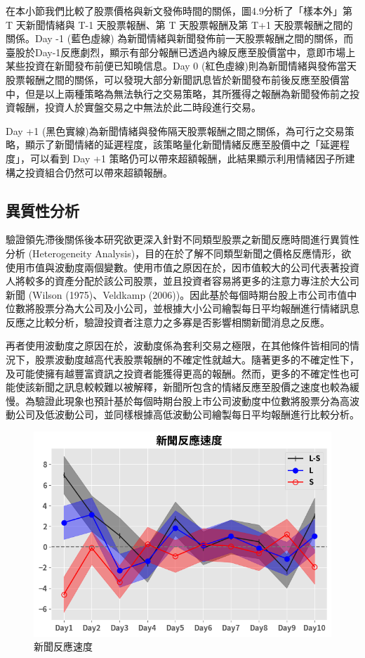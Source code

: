 \newpage

在本小節我們比較了股票價格與新文發佈時間的關係，圖4.9分析了「樣本外」第 T 天新聞情緒與 T-1 天股票報酬、第 T 天股票報酬及第 T+1 天股票報酬之間的關係。Day -1 (藍色虛線) 為新聞情緒與新聞發佈前一天股票報酬之間的關係，而臺股於Day-1反應劇烈，顯示有部分報酬已透過內線反應至股價當中，意即市場上某些投資在新聞發布前便已知曉信息。Day 0 (紅色虛線)則為新聞情緒與發佈當天股票報酬之間的關係，可以發現大部分新聞訊息皆於新聞發布前後反應至股價當中，但是以上兩種策略為無法執行之交易策略，其所獲得之報酬為新聞發佈前之投資報酬，投資人於實盤交易之中無法於此二時段進行交易。

Day +1 (黑色實線)為新聞情緒與發佈隔天股票報酬之間之關係，為可行之交易策略，顯示了新聞情緒的延遲程度，該策略量化新聞情緒反應至股價中之「延遲程度」，可以看到 Day +1 策略仍可以帶來超額報酬，此結果顯示利用情緒因子所建構之投資組合仍然可以帶來超額報酬。


\subsection{異質性分析}
驗證領先滯後關係後本研究欲更深入針對不同類型股票之新聞反應時間進行異質性分析 (Heterogeneity Analysis)，目的在於了解不同類型新聞之價格反應情形，欲使用市值與波動度兩個變數。使用市值之原因在於，因市值較大的公司代表著投資人將較多的資產分配於該公司股票，並且投資者容易將更多的注意力專注於大公司新聞 (Wilson (1975)、Veldkamp (2006))。因此基於每個時期台股上市公司市值中位數將股票分為大公司及小公司，並根據大小公司繪製每日平均報酬進行情緒訊息反應之比較分析，驗證投資者注意力之多寡是否影響相關新聞消息之反應。

再者使用波動度之原因在於，波動度係為套利交易之極限，在其他條件皆相同的情況下，股票波動度越高代表股票報酬的不確定性就越大。隨著更多的不確定性下，及可能使擁有越豐富資訊之投資者能獲得更高的報酬。然而，更多的不確定性也可能使該新聞之訊息較較難以被解釋，新聞所包含的情緒反應至股價之速度也較為緩慢。為驗證此現象也預計基於每個時期台股上市公司波動度中位數將股票分為高波動公司及低波動公司，並同樣根據高低波動公司繪製每日平均報酬進行比較分析。

\newpage

\begin{figure}[htbp]
\centering
\includegraphics[width=1.1\textwidth]{images/speed1.png}
\caption{新聞反應速度}
\end{figure}

